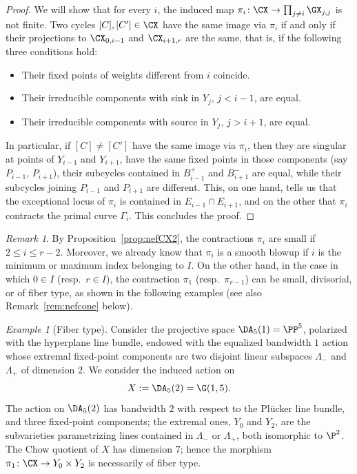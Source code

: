 \documentclass[11pt]{amsart}
\numberwithin{equation}{section}
\theoremstyle{definition}
\theoremstyle{remark}
\newtheorem{remark}[theorem]{Remark}
\newtheorem{example}[theorem]{Example}
\begin{document}
\begin{proof}
We will show that for every $i$, the induced map $\pi_i\colon \CX \to \prod_{j\not =  i} \GX_{j,j}$ is not finite. Two cycles $[C],[C'] \in \CX$ have the same image via $\pi_i$ if and only if their projections to $\CX_{0,i-1}$ and $\CX_{i+1,r}$ are the same, that is, if the following three conditions hold:
\begin{itemize}
\item Their fixed points of weights different from $i$ coincide. 
\item Their irreducible components  with sink in $Y_j$, $j < i-1$, are equal.
\item Their irreducible components with source in $Y_j$, $j > i+1$, are equal.
\end{itemize}

In particular, if $[C]\neq [C']$ have the same image via $\pi_i$, then they are singular at points of  $Y_{i-1}$ and $Y_{i+1}$, have the same fixed points in those components (say $P_{i-1}$, $P_{i+1}$), their subcycles contained in $B_{i-1}^+$ and $B_{i+1}^-$ are equal, while their subcycles joining $P_{i-1}$ and $P_{i+1}$ are different. This, on one hand, tells us that the exceptional locus of $\pi_i$ is contained in $E_{i-1}\cap E_{i+1}$, and on the other that $\pi_i$ contracts the primal curve $\Gamma_i$. This concludes the proof.
\end{proof}

\begin{remark}
By Proposition~\ref{prop:nefCX2}, the contractions $\pi_i$ are small if $2 \le i \le r-2$. 
Moreover, we already know that $\pi_i$ is a smooth blowup if $i$ is the minimum or maximum index belonging to $I$.
On the other hand, in the case in which $0\in I$ (resp.\ $r \in I$), the contraction $\pi_1$ (resp.\ $\pi_{r-1}$) can be small, divisorial, or of fiber type, as shown in the following examples (see also Remark~\ref{rem:nefcone} below).
\end{remark}

\begin{example}[Fiber type]\label{ex:ft} 
Consider the projective space $\DA_{5}(1)= \PP^{5}$, polarized with the hyperplane line bundle, endowed with the equalized bandwidth $1$ action whose extremal fixed-point components are two disjoint linear subspaces $\Lambda_-$ and $\Lambda_+$ of dimension $2$. We consider the induced action on \[X:=\DA_5(2) = \G(1,5).\]
The action on $\DA_{5}(2)$ has bandwidth $2$ with respect to the Pl{\"u}cker line bundle, and three fixed-point components; the extremal ones, $Y_0$ and $Y_2$, are the subvarieties parametrizing lines contained in $\Lambda_-$ or $\Lambda_+$, both isomorphic to $\P^2$. 
The Chow quotient of $X$ has dimension $7$; hence the morphism $\pi_1\colon \CX\to Y_0\times Y_2$ is necessarily of fiber type.
\end{example}
\end{document}
